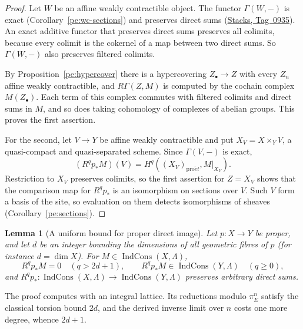 \documentclass[11pt,a4paper]{article}
\numberwithin{equation}{section}
\newtheorem{lemma}[theorem]{Lemma}
\theoremstyle{definition}
\theoremstyle{remark}
\newcommand{\proet}{\mathrm{pro}\acute{e}t}
\newcommand{\stacks}[1]{\href{https://stacks.math.columbia.edu/tag/#1}{\textnormal{Stacks, Tag~#1}}}
\newcommand{\IndCons}{\operatorname{IndCons}}
\begin{document}
\begin{proof}
Let $W$ be an affine weakly contractible object. The functor
$\Gamma(W,-)$ is exact (Corollary~\ref{pe:wc-sections}) and preserves direct sums
(\stacks{0935}). An exact additive functor that preserves direct sums
preserves all colimits, because every colimit is the cokernel of a map
between two direct sums. So $\Gamma(W,-)$ also preserves filtered
colimits.

By Proposition~\ref{pe:hypercover} there is a hypercovering $Z_\bullet\to Z$ with every
$Z_n$ affine weakly contractible, and $R\Gamma(Z,M)$ is computed by the
cochain complex $M(Z_\bullet)$. Each
term of this complex commutes with filtered colimits and direct sums in
$M$, and so does taking cohomology of complexes of abelian groups. This
proves the first assertion.

For the second, let $V\to Y$ be affine weakly contractible and put
$X_V=X\times_YV$, a quasi-compact and quasi-separated scheme. Since
$\Gamma(V,-)$ is exact,
\[
 (R^qp_*M)(V)=H^q((X_V)_{\proet},M|_{X_V}).
\]
Restriction to $X_V$ preserves colimits, so the first assertion for
$Z=X_V$ shows that the comparison map for $R^qp_*$ is an isomorphism on
sections over $V$. Such $V$ form a basis of the site, so evaluation on them
detects isomorphisms of sheaves (Corollary~\ref{pe:sections}).
\end{proof}

\begin{lemma}[A uniform bound for proper direct image]
\label{b:lem:proper-heart-bound}
Let $p:X\to Y$ be proper, and let $d$ be an integer bounding the
dimensions of all geometric fibres of $p$ (for instance $d=\dim X$). For
$M\in\IndCons(X,\Lambda)$,
\[
 R^qp_*M=0\quad(q>2d+1),\qquad R^qp_*M\in\IndCons(Y,\Lambda)\quad(q\geq0),
\]
and $R^qp_*:\IndCons(X,\Lambda)\to\IndCons(Y,\Lambda)$ preserves arbitrary
direct sums.
\end{lemma}

The proof computes with an integral lattice. Its reductions modulo
$\pi_E^n$ satisfy the classical torsion bound $2d$, and the derived
inverse limit over $n$ costs one more degree, whence $2d+1$.
\end{document}
